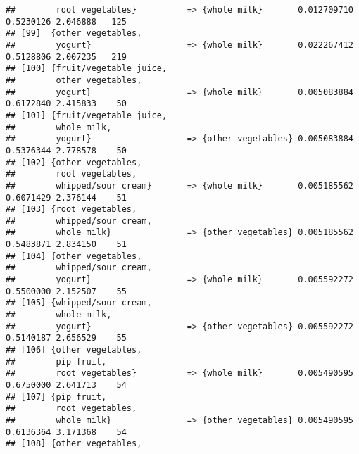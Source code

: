 \documentclass[]{article}
\begin{document}
\begin{verbatim}
##        root vegetables}          => {whole milk}       0.012709710  0.5230126 2.046888   125
## [99]  {other vegetables,                                                                    
##        yogurt}                   => {whole milk}       0.022267412  0.5128806 2.007235   219
## [100] {fruit/vegetable juice,                                                               
##        other vegetables,                                                                    
##        yogurt}                   => {whole milk}       0.005083884  0.6172840 2.415833    50
## [101] {fruit/vegetable juice,                                                               
##        whole milk,                                                                          
##        yogurt}                   => {other vegetables} 0.005083884  0.5376344 2.778578    50
## [102] {other vegetables,                                                                    
##        root vegetables,                                                                     
##        whipped/sour cream}       => {whole milk}       0.005185562  0.6071429 2.376144    51
## [103] {root vegetables,                                                                     
##        whipped/sour cream,                                                                  
##        whole milk}               => {other vegetables} 0.005185562  0.5483871 2.834150    51
## [104] {other vegetables,                                                                    
##        whipped/sour cream,                                                                  
##        yogurt}                   => {whole milk}       0.005592272  0.5500000 2.152507    55
## [105] {whipped/sour cream,                                                                  
##        whole milk,                                                                          
##        yogurt}                   => {other vegetables} 0.005592272  0.5140187 2.656529    55
## [106] {other vegetables,                                                                    
##        pip fruit,                                                                           
##        root vegetables}          => {whole milk}       0.005490595  0.6750000 2.641713    54
## [107] {pip fruit,                                                                           
##        root vegetables,                                                                     
##        whole milk}               => {other vegetables} 0.005490595  0.6136364 3.171368    54
## [108] {other vegetables,                                                                    

\end{verbatim}
\end{document}

